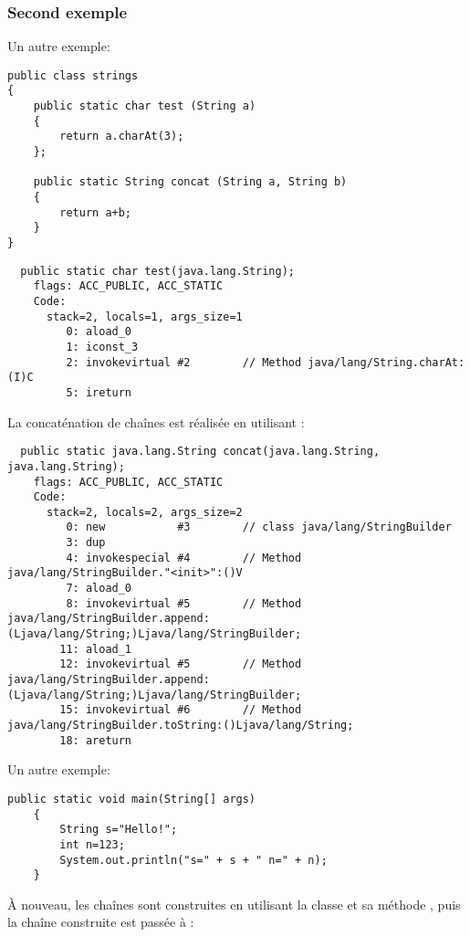 \subsubsection{Second exemple}

Un autre exemple:

\begin{lstlisting}[style=customjava]
public class strings
{
	public static char test (String a)
	{
		return a.charAt(3);
	};

	public static String concat (String a, String b)
	{
		return a+b;
	}
}
\end{lstlisting}

\begin{lstlisting}
  public static char test(java.lang.String);
    flags: ACC_PUBLIC, ACC_STATIC
    Code:
      stack=2, locals=1, args_size=1
         0: aload_0       
         1: iconst_3      
         2: invokevirtual #2        // Method java/lang/String.charAt:(I)C
         5: ireturn       
\end{lstlisting}
         
La concaténation de chaînes est réalisée en utilisant :

\begin{lstlisting}
  public static java.lang.String concat(java.lang.String, java.lang.String);
    flags: ACC_PUBLIC, ACC_STATIC
    Code:
      stack=2, locals=2, args_size=2
         0: new           #3        // class java/lang/StringBuilder
         3: dup           
         4: invokespecial #4        // Method java/lang/StringBuilder."<init>":()V
         7: aload_0       
         8: invokevirtual #5        // Method java/lang/StringBuilder.append:(Ljava/lang/String;)Ljava/lang/StringBuilder;
        11: aload_1       
        12: invokevirtual #5        // Method java/lang/StringBuilder.append:(Ljava/lang/String;)Ljava/lang/StringBuilder;
        15: invokevirtual #6        // Method java/lang/StringBuilder.toString:()Ljava/lang/String;
        18: areturn       
\end{lstlisting}

Un autre exemple:

\begin{lstlisting}[style=customjava]
	public static void main(String[] args)
	{
		String s="Hello!";
		int n=123;
		System.out.println("s=" + s + " n=" + n);
	}
\end{lstlisting}

À nouveau, les chaînes sont construites en utilisant la classe 
et sa méthode , puis la chaîne construite est passée à :


